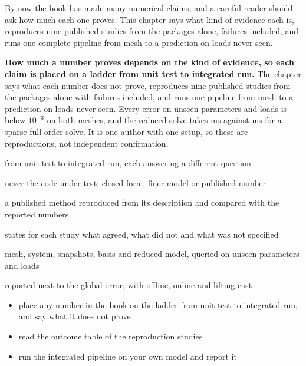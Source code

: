 \newpage\thispagestyle{hl}
\begin{hlquote}By now the book has made many numerical claims, and a careful reader should ask how much each one proves. This chapter says what kind of evidence each is, reproduces nine published studies from the packages alone, failures included, and runs one complete pipeline from mesh to a prediction on loads never seen.\end{hlquote}
\vspace{8pt}\begin{hlsum}\textbf{How much a number proves depends on the kind of evidence, so each claim is placed on a ladder from unit test to integrated run.} The chapter says what each number does not prove, reproduces nine published studies from the packages alone with failures included, and runs one pipeline from mesh to a prediction on loads never seen. Every error on unseen parameters and loads is below $10^{-3}$ on both meshes, and the reduced solve takes \cplSTRom{} ms against \cplSTFomsparse{} ms for a sparse full-order solve. It is one author with one setup, so these are reproductions, not independent confirmation.\end{hlsum}
\begin{description}\setlength\itemsep{5pt}\setlength\parsep{0pt}\renewcommand{\descriptionlabel}[1]{\hspace{\labelsep}\sffamily\bfseries\color{hlnavy}#1}
\item[Six levels of evidence] from unit test to integrated run, each answering a different question
\item[Independent reference] never the code under test: closed form, finer model or published number
\item[Reproduction study] a published method reproduced from its description and compared with the reported numbers
\item[Outcome table] states for each study what agreed, what did not and what was not specified
\item[Integrated pipeline] mesh, system, snapshots, basis and reduced model, queried on unseen parameters and loads
\item[Local quantity] reported next to the global error, with offline, online and lifting cost
\end{description}
\begin{itemize}\setlength\itemsep{3pt}
\item place any number in the book on the ladder from unit test to integrated run, and say what it does not prove
\item read the outcome table of the reproduction studies
\item run the integrated pipeline on your own model and report it
\end{itemize}
